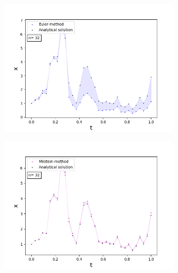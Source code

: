 \begin{figure}[!h]
\centering
   \begin{subfigure}{0.49\linewidth} \centering
     \includegraphics[scale=0.4]{Content/Graphics/SDE_EulerGBM_n_32}
   \end{subfigure}
   \begin{subfigure}{0.49\linewidth} \centering
     \includegraphics[scale=0.4]{Content/Graphics/SDE_MilsteinGBM_n_32}
   \end{subfigure}
   \begin{subfigure}{0.49\linewidth} \centering

\end{subfigure}
\end{figure}
